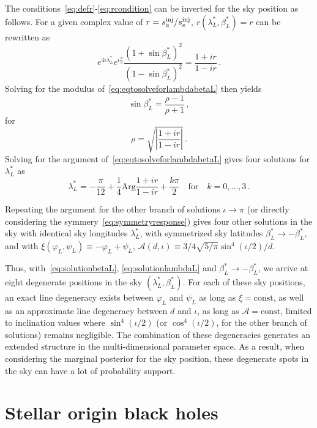 \documentclass[aps,showpacs,twocolumn,prd,superscriptaddress,nofootinbib]{revtex4}
\newcommand{\be}{\begin{equation}}
\newcommand{\ee}{\end{equation}}
\newcommand\calA{{\mathcal{A}}}
\newcommand\varphiL{{\varphi_{L}}}
\newcommand\psiL{{\psi_{L}}}
\begin{document}
The conditions~\eqref{eq:defr}-\eqref{eq:rcondition} can be inverted for the sky position as follows. For a given complex value of $r = s_{a}^{\rm inj} / s_{e}^{\rm inj}$, $r(\lambda_{L}^{*}, \beta_{L}^{*}) = r$ can be rewritten as
\be\label{eq:eqtosolveforlambdabetaL}
	e^{4i\lambda_{L}^{*}}e^{i\frac{\pi}{3}} \frac{\left( 1 +\sin\beta_{L}^{*} \right)^{2}}{\left( 1 - \sin\beta_{L}^{*} \right)^{2}} = \frac{1+ i r}{1 - i r} \,.
\ee
Solving for the modulus of~\eqref{eq:eqtosolveforlambdabetaL} then yields
\be\label{eq:solutionbetaL}
	\sin\beta_{L}^{*} = \frac{\rho - 1}{\rho + 1} \,,
\ee
for
\be
	\rho = \sqrt{\left| \frac{1+ i r}{1 - i r} \right|} \,.
\ee
Solving for the argument of~\eqref{eq:eqtosolveforlambdabetaL} gives four solutions for $\lambda_{L}^{*}$ as
\be\label{eq:solutionlambdaL}
	\lambda_{L}^{*} = - \frac{\pi}{12} + \frac{1}{4}\mathrm{Arg} \frac{1+ i r}{1 - i r} + \frac{k \pi}{2} \quad \mathrm{for} \quad k = 0,\dots,3 \,.
\ee

Repeating the argument for the other branch of solutions $\iota \rightarrow \pi$ (or directly considering the symmery~\eqref{eq:symmetryresponse}) gives four other solutions in the sky with identical sky longitudes $\lambda_{L}^{*}$, with symmetrized sky latitudes $\beta_{L}^{*} \rightarrow -\beta_{L}^{*}$, and with $\xi (\varphiL, \psiL) \equiv -\varphiL + \psiL$, $\calA(d, \iota) \equiv 3/4\sqrt{5/\pi}\sin^{4}(\iota/2)/d $.

Thus, with~\eqref{eq:solutionbetaL}, \eqref{eq:solutionlambdaL} and $\beta_{L}^{*} \rightarrow -\beta_{L}^{*}$, we arrive at eight degenerate positions in the sky $(\lambda_{L}^{*}, \beta_{L}^{*})$. For each of these sky positions, an exact line degeneracy exists between $\varphiL$ and $\psiL$ as long as $\xi = \mathrm{const}$, as well as an approximate line degeneracy between $d$ and $\iota$, as long as $\calA = \mathrm{const}$, limited to inclination values where $\sin^{4}(\iota/2)$ (or $\cos^{4}(\iota/2)$, for the other branch of solutions) remains negligible. The combination of these degeneracies generates an extended structure in the multi-dimensional parameter space. As a result, when considering the marginal posterior for the sky position, these degenerate spots in the sky can have a lot of probability support.


\section{Stellar origin black holes}
\label{sec:SOBH}
\end{document}
